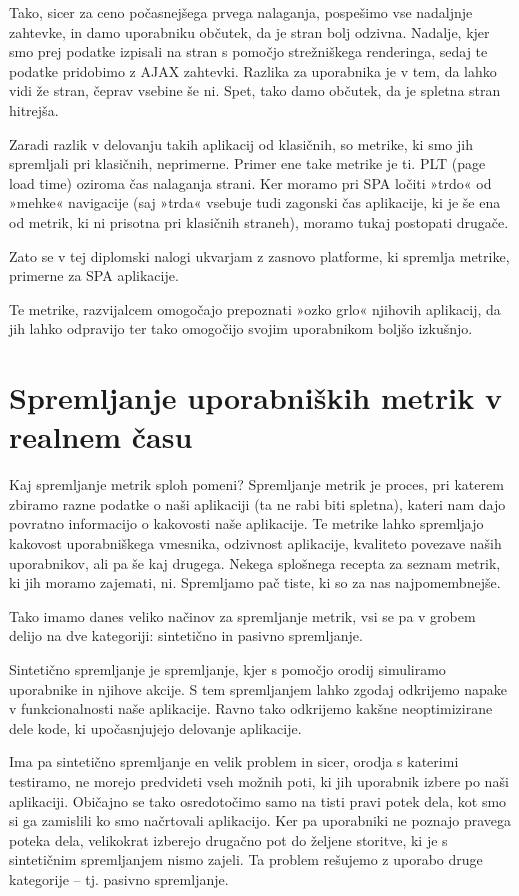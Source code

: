 \documentclass[a4paper, 12pt]{book}
\begin{document}
Tako, sicer za ceno počasnejšega prvega nalaganja, pospešimo vse nadaljnje zahtevke, in damo uporabniku občutek, da je stran bolj odzivna. Nadalje, kjer smo prej podatke izpisali na stran s pomočjo strežniškega renderinga, sedaj te podatke pridobimo z AJAX zahtevki. Razlika za uporabnika je v tem, da lahko vidi že stran, čeprav vsebine še ni. Spet, tako damo občutek, da je spletna stran hitrejša.

Zaradi razlik v delovanju takih aplikacij od klasičnih, so metrike, ki smo jih spremljali pri klasičnih, neprimerne. Primer ene take metrike je ti. PLT (page load time) oziroma čas nalaganja strani. Ker moramo pri SPA ločiti »trdo« od »mehke« navigacije (saj »trda« vsebuje tudi zagonski čas aplikacije, ki je še ena od metrik, ki ni prisotna pri klasičnih straneh), moramo tukaj postopati drugače.

Zato se v tej diplomski nalogi ukvarjam z zasnovo platforme, ki spremlja metrike, primerne za SPA aplikacije.

Te metrike, razvijalcem omogočajo prepoznati »ozko grlo« njihovih aplikacij, da jih lahko odpravijo ter tako omogočijo svojim uporabnikom boljšo izkušnjo.



\chapter{Spremljanje uporabniških metrik v realnem času}
\label{ch0}
Kaj spremljanje metrik sploh pomeni? Spremljanje metrik je proces, pri katerem zbiramo razne podatke o naši aplikaciji (ta ne rabi biti spletna), kateri nam dajo povratno informacijo o kakovosti naše aplikacije. Te metrike lahko spremljajo kakovost uporabniškega vmesnika, odzivnost aplikacije,  kvaliteto povezave naših uporabnikov, ali pa še kaj drugega. Nekega splošnega recepta za seznam metrik, ki jih moramo zajemati, ni. Spremljamo pač tiste, ki so za nas najpomembnejše.

Tako imamo danes veliko načinov za spremljanje metrik, vsi se pa v grobem delijo na dve kategoriji: sintetično in pasivno spremljanje.

Sintetično spremljanje je spremljanje, kjer s pomočjo orodij simuliramo uporabnike in njihove akcije. S tem spremljanjem lahko zgodaj odkrijemo napake v funkcionalnosti naše aplikacije. Ravno tako odkrijemo kakšne neoptimizirane dele kode, ki upočasnjujejo delovanje aplikacije.

Ima pa sintetično spremljanje en velik problem in sicer, orodja s katerimi testiramo, ne morejo predvideti vseh možnih poti, ki jih uporabnik izbere po naši aplikaciji. Običajno se tako osredotočimo samo na tisti pravi potek dela, kot smo si ga zamislili ko smo načrtovali aplikacijo. Ker pa uporabniki ne poznajo pravega poteka dela, velikokrat izberejo drugačno pot do željene storitve, ki je s sintetičnim spremljanjem nismo zajeli. Ta problem rešujemo z uporabo druge kategorije – tj.  pasivno spremljanje.
\end{document}
